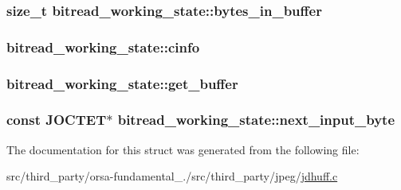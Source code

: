 \subsubsection[{bytes\+\_\+in\+\_\+buffer}]{\setlength{\rightskip}{0pt plus 5cm}size\+\_\+t bitread\+\_\+working\+\_\+state\+::bytes\+\_\+in\+\_\+buffer}\label{structbitread__working__state_a9564d55e83f5b154a50a84ffb4e45809}
\hypertarget{structbitread__working__state_ae6ed0f717c279eac7ac54cec32cfaa3e}{}
\subsubsection[{cinfo}]{ bitread\+\_\+working\+\_\+state\+::cinfo}\label{structbitread__working__state_ae6ed0f717c279eac7ac54cec32cfaa3e}
\hypertarget{structbitread__working__state_a1b14cadab00deca48688b336c6a48664}{}
\subsubsection[{get\+\_\+buffer}]{ bitread\+\_\+working\+\_\+state\+::get\+\_\+buffer}\label{structbitread__working__state_a1b14cadab00deca48688b336c6a48664}
\hypertarget{structbitread__working__state_a663f17ba1c850439118605f1842b2fbf}{}
\subsubsection[{next\+\_\+input\+\_\+byte}]{\setlength{\rightskip}{0pt plus 5cm}const {\bf J\+O\+C\+T\+E\+T}$\ast$ bitread\+\_\+working\+\_\+state\+::next\+\_\+input\+\_\+byte}\label{structbitread__working__state_a663f17ba1c850439118605f1842b2fbf}


The documentation for this struct was generated from the following file\+:\begin{DoxyCompactItemize}
\item 
src/third\+\_\+party/orsa-\/fundamental\+\_./src/third\+\_\+party/jpeg/\hyperlink{jdhuff_8c}{jdhuff.\+c}\end{DoxyCompactItemize}
